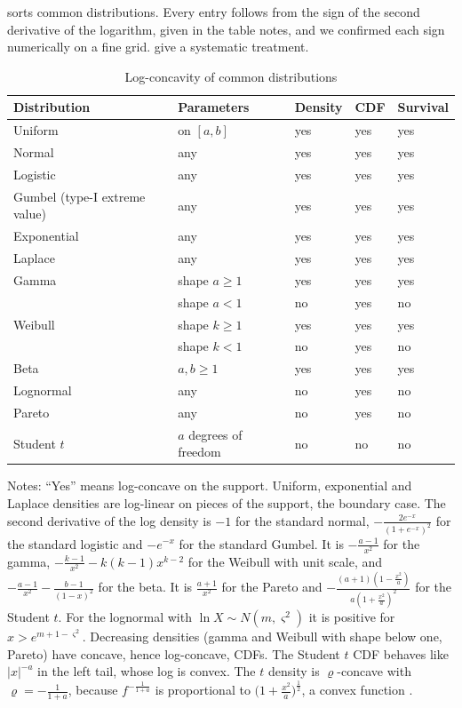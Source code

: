  sorts common distributions. Every entry follows from the sign of the second
derivative of the logarithm, given in the table notes, and we confirmed each sign numerically on a fine grid.
\citet{BagnoliBergstrom2005} give a systematic treatment.

\begin{table}[htbp]
\centering
\caption{Log-concavity of common distributions}\label{tab:B-logconcave}
\small
\begin{tabular}{@{}lllll@{}}
\toprule
Distribution & Parameters & Density & CDF & Survival \\
\midrule
Uniform & on $[a, b]$ & yes & yes & yes \\
Normal & any & yes & yes & yes \\
Logistic & any & yes & yes & yes \\
Gumbel (type-I extreme value) & any & yes & yes & yes \\
Exponential & any & yes & yes & yes \\
Laplace & any & yes & yes & yes \\
Gamma & shape $a \geq 1$ & yes & yes & yes \\
 & shape $a < 1$ & no & yes & no \\
Weibull & shape $k \geq 1$ & yes & yes & yes \\
 & shape $k < 1$ & no & yes & no \\
Beta & $a, b \geq 1$ & yes & yes & yes \\
Lognormal & any & no & yes & no \\
Pareto & any & no & yes & no \\
Student $t$ & $a$ degrees of freedom & no & no & no \\
\bottomrule
\end{tabular}
\par\smallskip
\begin{minipage}{0.92\textwidth}\footnotesize
Notes: ``Yes'' means log-concave on the support. Uniform, exponential and Laplace densities are log-linear on
pieces of the support, the boundary case. The second derivative of the log density is $-1$ for the standard
normal, $-\frac{2e^{-x}}{(1 + e^{-x})^2}$ for the standard logistic and $-e^{-x}$ for the standard Gumbel. It is
$-\frac{a - 1}{x^2}$ for the gamma, $-\frac{k - 1}{x^2} - k(k - 1)x^{k - 2}$ for the Weibull with unit scale, and
$-\frac{a - 1}{x^2} - \frac{b - 1}{(1 - x)^2}$ for the beta. It is $\frac{a + 1}{x^2}$ for the Pareto and
$-\frac{(a + 1)(1 - \frac{x^2}{a})}{a(1 + \frac{x^2}{a})^2}$ for the Student $t$. For the lognormal with
$\ln X \sim N(m, \varsigma^2)$ it is positive for $x > e^{m + 1 - \varsigma^2}$. Decreasing densities (gamma and Weibull with shape below one,
Pareto) have concave, hence log-concave, CDFs. The Student $t$ CDF behaves like $|x|^{-a}$ in the left tail, whose
log is convex. The $t$ density is $\varrho$-concave with $\varrho = -\frac{1}{1 + a}$, because $f^{-\frac{1}{1 + a}}$ is
proportional to $\bigl(1 + \frac{x^2}{a}\bigr)^{\frac{1}{2}}$, a convex function
\citep[Section 3]{CaplinNalebuff1991}.
\end{minipage}
\end{table}

